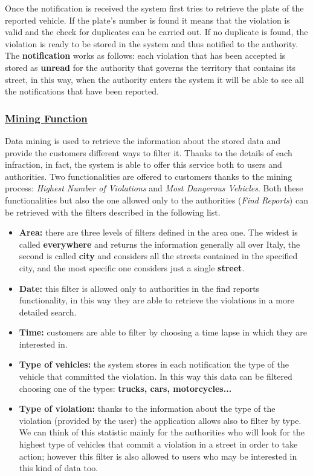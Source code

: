 		Once the notification is received the system first tries to retrieve the plate of the reported vehicle. If the plate's number is found it means that the violation is valid and the check for duplicates can be carried out. If no duplicate is found, the violation is ready to be stored in the system and thus notified to the authority. The \textbf{notification} works as follows: each violation that has been accepted is stored as \textbf{unread} for the authority that governs the territory that contains its street, in this way, when the authority enters the system it will be able to see all the notifications that have been reported. 

	\subsubsection[Statistics Function]{\hyperlink{toc}{Mining Function}}
		Data mining is used to retrieve the information about the stored data and provide the customers different ways to filter it. Thanks to the details of each infraction, in fact, the system is able to offer this service both to users and authorities. Two functionalities are offered to customers thanks to the mining process: \emph{Highest Number of Violations} and \emph{Most Dangerous Vehicles}. Both these functionalities but also the one allowed only to the authorities (\emph{Find Reports}) can be retrieved with the filters described in the following list.
			
		\begin{itemize}
			\item \textbf{Area:} there are three levels of filters defined in the area one. The widest is called \textbf{everywhere} and returns the information generally all over Italy, the second is called \textbf{city} and considers all the streets contained in the specified city, and the most specific one considers just a single \textbf{street}.
			
			\item \textbf{Date:} this filter is allowed only to authorities in the find reports functionality, in this way they are able to retrieve the violations in a more detailed search.
			
			\item \textbf{Time:} customers are able to filter by choosing a time lapse in which they are interested in. 
			
			\item \textbf{Type of vehicles:} the system stores in each notification the type of the vehicle that committed the violation. In this way this data can be filtered choosing one of the types: \textbf{trucks, cars, motorcycles...}
			
			\item \textbf{Type of violation:} thanks to the information about the type of the violation (provided by the user) the application allows also to filter by type. We can think of this statistic mainly for the authorities who will look for the highest type of vehicles that commit a violation in a street in order to take action; however this filter is also allowed to users who may be interested in this kind of data too.
		\end{itemize}
	

